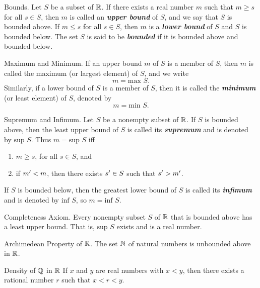 \documentclass[12pt]{article}
\begin{document}
\begin{definition}{Bounds.}
  Let $S$ be a subset of $\mathbb{R}$. If there exists a real number $m$ such that
  $m\ge s$ for all $s\in S$, then $m$ is called an \textit{\textbf{upper bound}}
  of $S$, and we say that $S$ is bounded above. If $m\le s$ for all $s\in S$,
  then $m$ is a \textit{\textbf{lower bound}} of $S$ and $S$ is bounded below.
  The set $S$ is said to be \textit{\textbf{bounded}} if it is bounded above and
  bounded below.
\end{definition}

\begin{definition}{Maximum and Minimum.}
  If an upper bound $m$ of $S$ is a member of $S$, then $m$ is called the
  maximum (or largest element) of $S$, and we write $$m=\text{max } S.$$
  Similarly, if a lower bound of $S$ is a member of $S$, then it is called
  the \textit{\textbf{minimum}} (or least element) of $S$, denoted by
  $$m=\text{min } S.$$
\end{definition}

\begin{definition}{Supremum and Infimum.}
  Let $S$ be a nonempty subset of $\mathbb{R}$. If $S$ is bounded above, then the least
  upper bound of $S$ is called its \textit{\textbf{supremum}} and is denoted
  by $\text{sup } S$. Thus $m=\text{sup } S$ iff
  \begin{enumerate}
    \item $m \ge s$, for all $s \in S$, and 
    \item if $m' < m$, then there exists $s' \in S$ such that $s' > m'$.
  \end{enumerate}
  If $S$ is bounded below, then the greatest lower bound of $S$ is called its
  \textit{\textbf{infimum}} and is denoted by $\text{inf } S$, so
  $m=\text{inf } S$.
\end{definition}

\begin{definition}{Completeness Axiom.}
  Every nonempty subset $S$ of $\mathbb{R}$ that is bounded above has a least upper
  bound. That is, $\text{sup } S$ exists and is a real number.
\end{definition}

\begin{definition}{Archimedean Property of $\mathbb{R}$.}
  The set $\mathbb{N}$ of natural numbers is unbounded above in $\mathbb{R}$.
\end{definition}

\begin{definition}{Density of $\mathbb{Q}$ in $\mathbb{R}$}
  If $x$ and $y$ are real numbers with $x < y$, then there exists a rational
  number $r$ such that $x < r < y$.
\end{definition}
\end{document}
